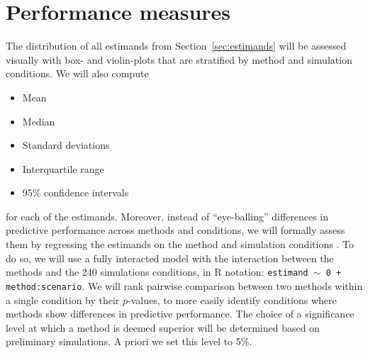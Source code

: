 \documentclass[a4paper, 11pt]{article}\usepackage[]{graphicx}\usepackage[]{color}
\begin{document}
\section{Performance measures} \label{sec:performance}

The distribution of all estimands from Section~\ref{sec:estimands} will be
assessed visually with box- and violin-plots that are stratified by method and
simulation conditions. We will also compute
\begin{itemize}
  \item Mean
  \item Median
  \item Standard deviations
  \item Interquartile range
  \item 95\% confidence intervals
\end{itemize}
for each of the estimands. Moreover, instead of ``eye-balling'' differences in predictive
performance across methods and conditions, we will formally assess them by regressing
the estimands on the method and simulation conditions \citep[\cf][]{Skrondal2000}.
To do so, we will use
a fully interacted model with the interaction between the methods and the
240 simulations conditions, \ie in R notation:
\texttt{estimand $\sim$ 0 + method:scenario}. %
We will rank pairwise comparison between two methods within a single condition
by their $p$-values, to more easily identify conditions where methods
show differences in predictive performance. The choice of a significance level
at which a method is deemed superior will be determined based on preliminary
simulations. A priori we set this level to 5\%.
\end{document}
